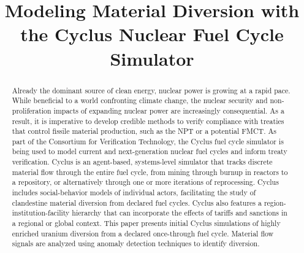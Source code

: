 \documentclass[12pt]{paper}
\begin{document}
\title{Modeling Material Diversion with the Cyclus Nuclear Fuel Cycle Simulator
}


\date{}
%

\maketitle



\begin{abstract}

  Already the dominant source of clean energy, nuclear power is growing at a
  rapid pace.  While beneficial to a world confronting climate change, the
  nuclear security and non-proliferation impacts of expanding nuclear power
  are increasingly consequential.  As a result, it is imperative to develop
  credible methods to verify compliance with treaties that control fissile
  material production, such as the \gls{NPT} or a potential
  \gls{FMCT}. As part of the Consortium for Verification
  Technology, the Cyclus fuel cycle simulator is being used to model current
  and next-generation nuclear fuel cycles and inform treaty verification.  Cyclus
  is an agent-based, systems-level simulator that tracks discrete material flow
  through the entire fuel cycle, from mining through burnup in reactors to a
  repository, or alternatively through one or more iterations of reprocessing.
  Cyclus includes social-behavior models of individual actors, facilitating the
  study of clandestine material diversion from declared fuel cycles.  Cyclus
  also features a region-institution-facility hierarchy that can incorporate the
  effects of tariffs and sanctions in a regional or global context.  This paper
  presents initial Cyclus simulations of highly enriched uranium diversion from
  a declared once-through fuel cycle.  Material flow signals are analyzed using
  anomaly detection techniques to identify diversion.

\end{abstract}











%
\end{document}
